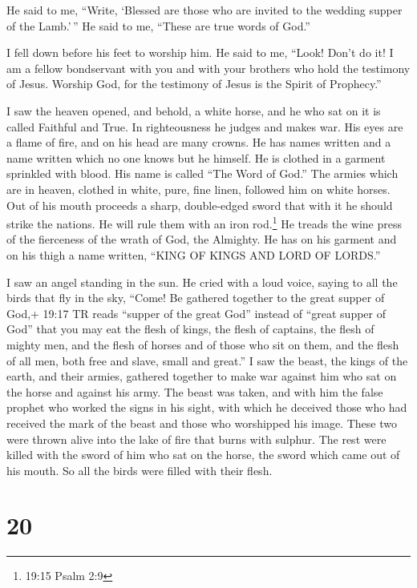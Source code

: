  He said to me, ``Write, `Blessed are those who are invited
to the wedding supper of the Lamb.'\,'' He said to me, ``These are true
words of God.''

 I fell down before his feet to worship him. He said to me,
``Look! Don't do it! I am a fellow bondservant with you and with your
brothers who hold the testimony of Jesus. Worship God, for the testimony
of Jesus is the Spirit of Prophecy.''

 I saw the heaven opened, and behold, a white horse, and he
who sat on it is called Faithful and True. In righteousness he judges
and makes war.  His eyes are a flame of fire, and on his
head are many crowns. He has names written and a name written which no
one knows but he himself.  He is clothed in a garment
sprinkled with blood. His name is called ``The Word of God.''
 The armies which are in heaven, clothed in white, pure,
fine linen, followed him on white horses.  Out of his mouth
proceeds a sharp, double-edged sword that with it he should strike the
nations. He will rule them with an iron rod.\footnote{19:15 Psalm 2:9}
He treads the wine press of the fierceness of the wrath of God, the
Almighty.  He has on his garment and on his thigh a name
written, ``KING OF KINGS AND LORD OF LORDS.''

 I saw an angel standing in the sun. He cried with a loud
voice, saying to all the birds that fly in the sky, ``Come! Be gathered
together to the great supper of God,+ 19:17 TR reads ``supper of the
great God'' instead of ``great supper of God''  that you
may eat the flesh of kings, the flesh of captains, the flesh of mighty
men, and the flesh of horses and of those who sit on them, and the flesh
of all men, both free and slave, small and great.''  I saw
the beast, the kings of the earth, and their armies, gathered together
to make war against him who sat on the horse and against his army.
 The beast was taken, and with him the false prophet who
worked the signs in his sight, with which he deceived those who had
received the mark of the beast and those who worshipped his image. These
two were thrown alive into the lake of fire that burns with sulphur.
 The rest were killed with the sword of him who sat on the
horse, the sword which came out of his mouth. So all the birds were
filled with their flesh.

\hypertarget{section-19}{%
\section{20}\label{section-19}}

